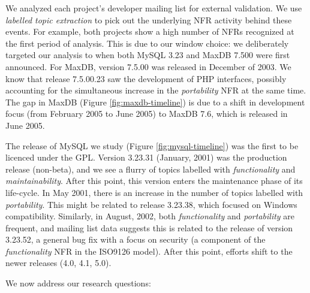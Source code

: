 \documentclass[smallextended]{svjour3}       %
\begin{document}
We analyzed each project's developer mailing list for external validation. 
We use \textit{labelled topic extraction} to pick out the underlying NFR activity behind these events. 
For example, both projects show a high number of NFRs recognized at the first period of analysis. 
This is due to our window choice: we deliberately targeted our
analysis to when both MySQL 3.23
and MaxDB 7.500 were first announced. For MaxDB, version 7.5.00  was released in December of 2003. 
We know that release 7.5.00.23 saw the development of PHP interfaces, possibly accounting for the simultaneous increase in the \emph{portability} NFR at the same time.
The gap in MaxDB (Figure \ref{fig:maxdb-timeline}) is due to a shift in development focus (from February 2005 to June 2005) to MaxDB 7.6, which is released in June 2005.

The release of MySQL we study  (Figure \ref{fig:mysql-timeline}) was the first to be licenced under the GPL. 
Version 3.23.31 (January, 2001) was the production release (non-beta), and we see a flurry of topics labelled with \emph{functionality} and \emph{maintainability}. 
After this point, this version enters the maintenance phase of its life-cycle. 
In May 2001, there is an increase in the number of topics labelled with \emph{portability}. 
This might be related to release 3.23.38, which focused on Windows compatibility. 
Similarly, in August, 2002, both \emph{functionality} and \emph{portability} are frequent, and mailing list data suggests this is related to the release of version 3.23.52, a general bug fix with a focus on security (a component of the \emph{functionality} NFR in the ISO9126 model). 
After this point, efforts shift to the newer releases (4.0, 4.1,
5.0). 

We now address our research questions:

\end{document}
